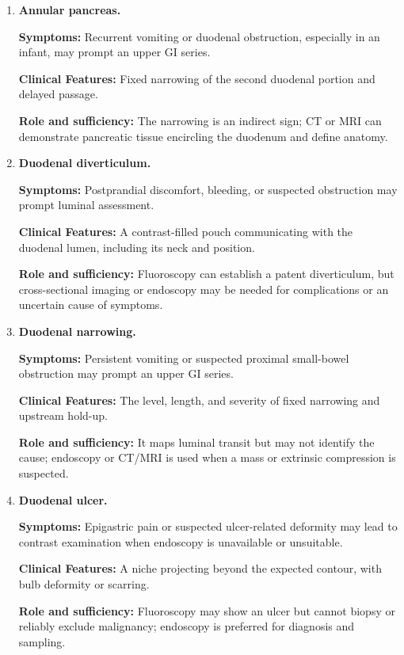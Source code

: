 \begin{enumerate}[leftmargin=*,itemsep=0.45em,topsep=0.4em]
\item \textbf{Annular pancreas.}\par\noindent\textbf{Symptoms:} Recurrent vomiting or duodenal obstruction, especially in an infant, may prompt an upper GI series.\par\noindent\textbf{Clinical Features:} Fixed narrowing of the second duodenal portion and delayed passage.\par\noindent\textbf{Role and sufficiency:} The narrowing is an indirect sign; CT or MRI can demonstrate pancreatic tissue encircling the duodenum and define anatomy.
\item \textbf{Duodenal diverticulum.}\par\noindent\textbf{Symptoms:} Postprandial discomfort, bleeding, or suspected obstruction may prompt luminal assessment.\par\noindent\textbf{Clinical Features:} A contrast-filled pouch communicating with the duodenal lumen, including its neck and position.\par\noindent\textbf{Role and sufficiency:} Fluoroscopy can establish a patent diverticulum, but cross-sectional imaging or endoscopy may be needed for complications or an uncertain cause of symptoms.
\item \textbf{Duodenal narrowing.}\par\noindent\textbf{Symptoms:} Persistent vomiting or suspected proximal small-bowel obstruction may prompt an upper GI series.\par\noindent\textbf{Clinical Features:} The level, length, and severity of fixed narrowing and upstream hold-up.\par\noindent\textbf{Role and sufficiency:} It maps luminal transit but may not identify the cause; endoscopy or CT/MRI is used when a mass or extrinsic compression is suspected.
\item \textbf{Duodenal ulcer.}\par\noindent\textbf{Symptoms:} Epigastric pain or suspected ulcer-related deformity may lead to contrast examination when endoscopy is unavailable or unsuitable.\par\noindent\textbf{Clinical Features:} A niche projecting beyond the expected contour, with bulb deformity or scarring.\par\noindent\textbf{Role and sufficiency:} Fluoroscopy may show an ulcer but cannot biopsy or reliably exclude malignancy; endoscopy is preferred for diagnosis and sampling.

\end{enumerate}
